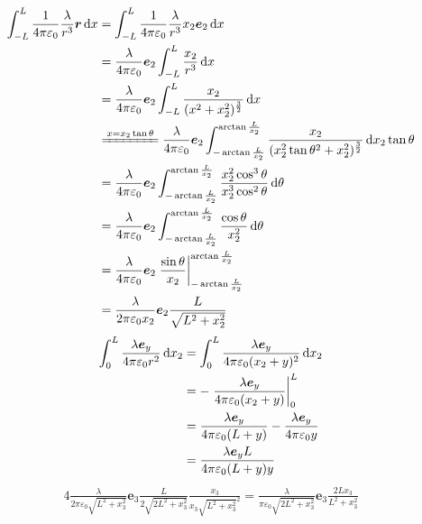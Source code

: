 \begin{align*}
    \int_{-L}^L\frac{1}{4\pi\varepsilon_0}\frac{\lambda}{r^3}\boldsymbol{r}\dif x
    &=\int_{-L}^L\frac{1}{4\pi\varepsilon_0}\frac{\lambda}{r^3}{x_2\boldsymbol e_2}\dif x\\&
    =\frac{\lambda}{4\pi\varepsilon_0}\boldsymbol e_2\int_{-L}^L\frac{x_2}{r^3}\dif x\\&
    =\frac{\lambda}{4\pi\varepsilon_0}\boldsymbol e_2\int_{-L}^L\frac{x_2}{(x^2+x_2^2)^\frac{3}{2}}\dif x\\&
    \xlongequal{x=x_2\tan\theta}\frac{\lambda}{4\pi\varepsilon_0}\boldsymbol e_2\int_{-\arctan \frac{L}{x_2}}^{\arctan \frac{L}{x_2}}\frac{x_2}{(x_2^2\tan\theta^2+x_2^2)^\frac{3}{2}}\dif x_2\tan\theta\\&
    =\frac{\lambda}{4\pi\varepsilon_0}\boldsymbol e_2\int_{-\arctan \frac{L}{x_2}}^{\arctan \frac{L}{x_2}}\frac{x_2^2\cos^3\theta}{x_2^3\cos^2\theta}\dif\theta\\&
    =\frac{\lambda}{4\pi\varepsilon_0}\boldsymbol e_2\int_{-\arctan \frac{L}{x_2}}^{\arctan \frac{L}{x_2}}\frac{\cos\theta}{x_2^2}\dif \theta\\&
    =\frac{\lambda}{4\pi\varepsilon_0}\boldsymbol e_2\left.\frac{\sin\theta}{x_2}\right|_{-\arctan \frac{L}{x_2}}^{\arctan \frac{L}{x_2}}\\&
    =\frac{\lambda}{2\pi\varepsilon_0x_2}\boldsymbol e_2\frac{L}{\sqrt{L^2+x_2^2}}
\end{align*}
\begin{align*}
    \int_{0}^{L}\frac{\lambda \boldsymbol e_{y}}{4\pi\varepsilon_0 r^2}\dif x_2
    &=\int_{0}^{L}\frac{\lambda \boldsymbol e_{y}}{4\pi\varepsilon_0 (x_2+y)^2}\dif x_2\\&
    =-\left.\frac{\lambda \boldsymbol e_{y}}{4\pi\varepsilon_0 (x_2+y)}\right|_{0}^{L}\\&
    =\frac{\lambda \boldsymbol e_{y}}{4\pi\varepsilon_0 (L+y)}-\frac{\lambda \boldsymbol e_{y}}{4\pi\varepsilon_0 y}\\&
    =\frac{\lambda \boldsymbol e_{y}L}{4\pi\varepsilon_0 (L+y)y}
\end{align*}
\begin{align*}
    4\frac{\lambda}{2\pi\varepsilon_0\sqrt{L^2+x_3^2}}\boldsymbol e_3\frac{L}{2\sqrt{2L^2+x_3^2}}\frac{x_3}{x_3\sqrt{L^2+x_3^2}^2}
    =\frac{\lambda}{\pi\varepsilon_0\sqrt{2L^2+x_3^2}}\boldsymbol e_3\frac{2Lx_3}{{L^2+x_3^2}}
\end{align*}

